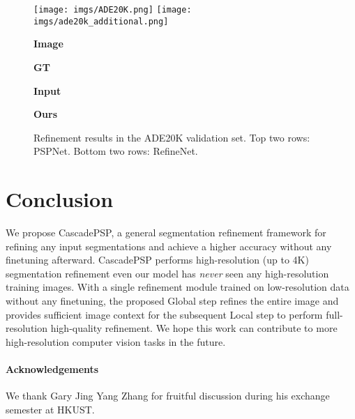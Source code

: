 \documentclass[10pt,twocolumn,letterpaper]{article}
\begin{document}
\begin{figure}[h]
\centering
{}
\centering
	\texttt{[image: imgs/ADE20K.png]}
	\texttt{[image: imgs/ade20k\_additional.png]}
    	\begin{center}
        	\textbf{Image}
    	\end{center}
	\endminipage\hfill
    	\begin{center}
        	\textbf{GT}
    	\end{center}
	\endminipage\hfill
    	\begin{center}
        	\textbf{Input}
    	\end{center}
	\endminipage\hfill
    	\begin{center}
        	\textbf{Ours}
    	\end{center}
	\endminipage\hfill
\endminipage
\vspace{0.05in}
\caption{Refinement results in the ADE20K validation set. 
    Top two rows: PSPNet. Bottom two rows: RefineNet.}
\label{fig:ade_fine_results}
\vspace{-0.25in}
\end{figure}


\section{Conclusion}
\vspace{-0.05in}
We propose CascadePSP, a general segmentation refinement framework for refining any input segmentations and achieve a higher accuracy without any finetuning afterward. CascadePSP performs high-resolution (up to 4K) segmentation refinement even our model has \textit{never} seen any high-resolution training images. 
With a single refinement module trained on low-resolution data without any finetuning, the proposed Global step refines the entire image and provides sufficient image context for the subsequent Local step to perform full-resolution high-quality refinement.
We hope this work can contribute to more high-resolution computer vision tasks in the future.
\vspace{-1em}

{\small
\paragraph{Acknowledgements}
We thank Gary Jing Yang Zhang for fruitful discussion during his exchange semester at HKUST.
}
\end{document}
